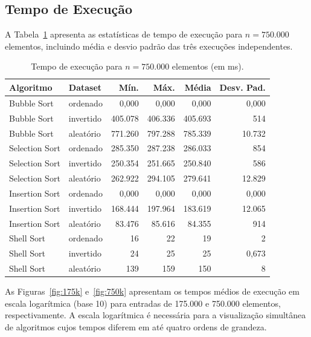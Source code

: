 \documentclass[12pt]{article}
\begin{document}
\subsection{Tempo de Execução}

A Tabela~\ref{tab:tempo} apresenta as estatísticas de tempo
de execução para $n = 750.000$ elementos, incluindo média e
desvio padrão das três execuções independentes.

\begin{table}[ht]
\centering
\caption{Tempo de execução para $n = 750.000$ elementos (em ms).}
\label{tab:tempo}
\begin{tabular}{llrrrr}
\toprule
\textbf{Algoritmo} & \textbf{Dataset} &
\textbf{Mín.} & \textbf{Máx.} &
\textbf{Média} & \textbf{Desv. Pad.} \\
\midrule
Bubble Sort    & ordenado  & 0,000     & 0,000     & 0,000       & 0,000       \\
Bubble Sort    & invertido & 405.078   & 406.336   & 405.693     & 514         \\
Bubble Sort    & aleatório & 771.260   & 797.288   & 785.339     & 10.732      \\
\midrule
Selection Sort & ordenado  & 285.350   & 287.238   & 286.033     & 854         \\
Selection Sort & invertido & 250.354   & 251.665   & 250.840     & 586         \\
Selection Sort & aleatório & 262.922   & 294.105   & 279.641     & 12.829      \\
\midrule
Insertion Sort & ordenado  & 0,000     & 0,000     & 0,000       & 0,000       \\
Insertion Sort & invertido & 168.444   & 197.964   & 183.619     & 12.065      \\
Insertion Sort & aleatório & 83.476    & 85.616    & 84.355      & 914         \\
\midrule
Shell Sort     & ordenado  & 16        & 22        & 19          & 2           \\
Shell Sort     & invertido & 24        & 25        & 25          & 0,673       \\
Shell Sort     & aleatório & 139       & 159       & 150         & 8           \\
\bottomrule
\end{tabular}
\end{table}

As Figuras~\ref{fig:175k} e~\ref{fig:750k} apresentam os
tempos médios de execução em escala logarítmica (base 10)
para entradas de 175.000 e 750.000 elementos, respectivamente.
A escala logarítmica é necessária para a visualização simultânea
de algoritmos cujos tempos diferem em até quatro ordens de
grandeza.
\end{document}
